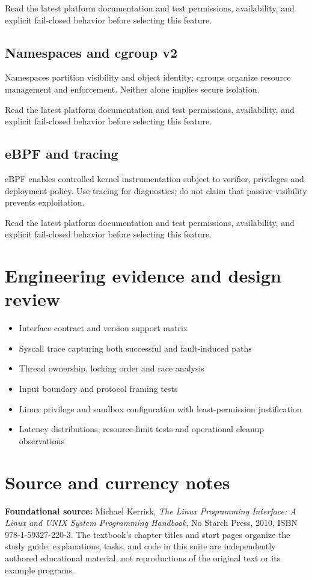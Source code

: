 \documentclass[11pt,letterpaper,oneside]{report}
\begin{document}
\begin{modernnote}
Read the latest platform documentation and test permissions, availability, and explicit fail-closed behavior before selecting this feature.
\end{modernnote}
\section{Namespaces and cgroup v2}
Namespaces partition visibility and object identity; cgroups organize resource management and enforcement. Neither alone implies secure isolation.

\begin{modernnote}
Read the latest platform documentation and test permissions, availability, and explicit fail-closed behavior before selecting this feature.
\end{modernnote}
\section{eBPF and tracing}
eBPF enables controlled kernel instrumentation subject to verifier, privileges and deployment policy. Use tracing for diagnostics; do not claim that passive visibility prevents exploitation.

\begin{modernnote}
Read the latest platform documentation and test permissions, availability, and explicit fail-closed behavior before selecting this feature.
\end{modernnote}
\chapter{Engineering evidence and design review}
\begin{itemize}
\item Interface contract and version support matrix
\item Syscall trace capturing both successful and fault-induced paths
\item Thread ownership, locking order and race analysis
\item Input boundary and protocol framing tests
\item Linux privilege and sandbox configuration with least-permission justification
\item Latency distributions, resource-limit tests and operational cleanup observations
\end{itemize}

\chapter*{Source and currency notes}
\textbf{Foundational source:} Michael Kerrisk, \emph{The Linux Programming Interface: A Linux and UNIX System Programming Handbook}, No Starch Press, 2010, ISBN 978-1-59327-220-3. The textbook's chapter titles and start pages organize the study guide; explanations, tasks, and code in this suite are independently authored educational material, not reproductions of the original text or its example programs.
\end{document}
